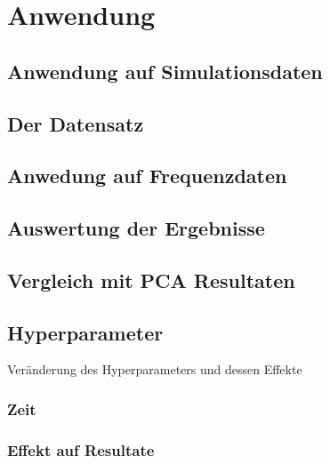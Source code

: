 \chapter{Anwendung}

\label{application}

\section{Anwendung auf Simulationsdaten}

\section{Der Datensatz}

\section{Anwedung auf Frequenzdaten}

\section{Auswertung der Ergebnisse}

\section{Vergleich mit PCA Resultaten}

\section{Hyperparameter}
Veränderung des Hyperparameters und dessen Effekte
\subsection{Zeit}
\subsection{Effekt auf Resultate}